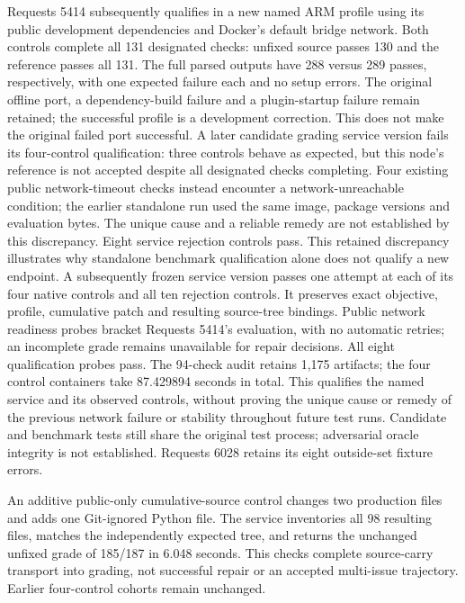 Requests 5414 subsequently qualifies in a new named ARM profile
using its public development dependencies and Docker's default bridge network.
Both controls complete all 131 designated checks: unfixed source passes 130
and the reference passes all 131. The full parsed outputs have 288 versus 289
passes, respectively, with one expected failure each and no setup errors.
The original offline port, a dependency-build failure and a plugin-startup
failure remain retained; the successful profile is a development correction.
This does not make the original failed port successful. A later candidate
grading service version fails its four-control qualification: three controls
behave as expected, but this node's reference is not accepted despite all
designated checks completing. Four existing public network-timeout checks
instead encounter a network-unreachable condition; the earlier standalone
run used the same image, package versions and evaluation bytes. The unique
cause and a reliable remedy are not established by this discrepancy.
Eight service rejection controls pass. This retained discrepancy illustrates
why standalone benchmark qualification alone does not qualify a new endpoint.
A subsequently frozen service version passes one attempt at each of its four
native controls and all ten rejection controls. It preserves exact objective,
profile, cumulative patch and resulting source-tree bindings. Public network
readiness probes bracket Requests 5414's evaluation, with no automatic retries;
an incomplete grade remains unavailable for repair decisions. All eight
qualification probes pass. The 94-check audit retains 1,175 artifacts; the four
control containers take 87.429894 seconds in total. This qualifies the named
service and its observed controls, without proving the unique cause or remedy
of the previous network failure or stability throughout future test runs.
Candidate and benchmark tests still share the original test process; adversarial
oracle integrity is not established. Requests 6028 retains its eight
outside-set fixture errors.

An additive public-only cumulative-source control changes two production files
and adds one Git-ignored Python file. The service inventories all 98 resulting
files, matches the independently expected tree, and returns the unchanged
unfixed grade of 185/187 in 6.048 seconds. This checks complete source-carry
transport into grading, not successful repair or an accepted multi-issue
trajectory. Earlier four-control cohorts remain unchanged.

